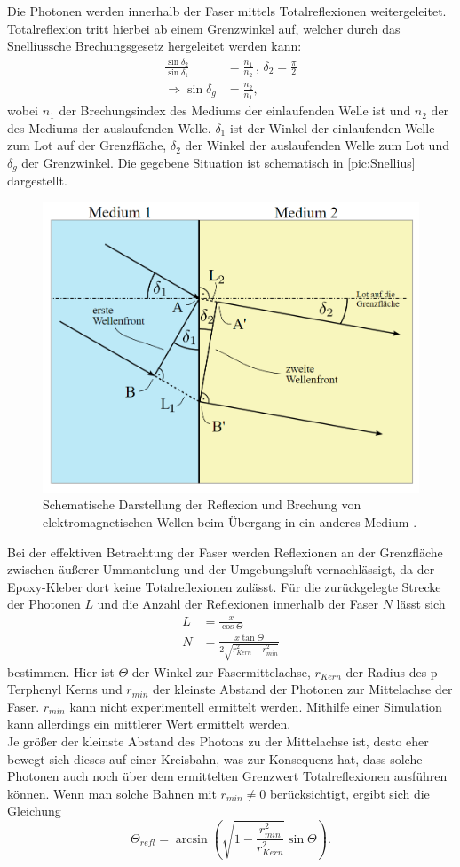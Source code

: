 Die Photonen werden innerhalb der Faser mittels Totalreflexionen weitergeleitet. Totalreflexion
tritt hierbei ab einem Grenzwinkel auf, welcher durch das Snelliussche Brechungsgesetz hergeleitet werden kann:
\begin{align}
    \label{eq:Snellius}
    \frac{\sin{\delta_2}}{\sin{\delta_1}} &= \frac{n_1}{n_2} \, , \, \delta_2 = \frac{\pi}{2} \\
    \Rightarrow \sin{\delta_g} &= \frac{n_2}{n_1},
\end{align}
wobei $n_1$ der Brechungsindex des Mediums der einlaufenden Welle ist und $n_2$ der des Mediums der auslaufenden
Welle. $\delta_1$ ist der Winkel der einlaufenden Welle zum Lot auf der Grenzfläche, $\delta_2$ der Winkel der auslaufenden
Welle zum Lot und $\delta_g$ der Grenzwinkel. Die gegebene Situation ist schematisch in \autoref{pic:Snellius} dargestellt.\\
\begin{figure}
    \centering
    \includegraphics[width = .5\textwidth]{content/pics/Snellius.png}
    \caption{Schematische Darstellung der Reflexion und Brechung von elektromagnetischen Wellen beim Übergang in ein anderes Medium \cite{Snellius}.}
    \label{pic:Snellius}
\end{figure}
Bei der effektiven Betrachtung der Faser werden Reflexionen an der Grenzfläche zwischen äußerer Ummantelung und der Umgebungsluft vernachlässigt, da der
Epoxy-Kleber dort keine Totalreflexionen zulässt. Für die zurückgelegte Strecke der Photonen $L$ und die Anzahl der Reflexionen innerhalb
der Faser $N$ lässt sich
\begin{align}
    \label{eq:rel}
    L &= \frac{x}{\cos{\Theta}}\\
    N &= \frac{x \tan{\Theta}}{2 \sqrt{r^2_{Kern} - r^2_{min}}}
\end{align}
bestimmen. Hier ist $\Theta$ der Winkel zur Fasermittelachse, $r_{Kern}$ der Radius des p-Terphenyl Kerns und $r_{min}$ der kleinste
Abstand der Photonen zur Mittelachse der Faser. $r_{min}$ kann nicht experimentell ermittelt werden. Mithilfe einer Simulation kann allerdings
ein mittlerer Wert ermittelt werden.\\
Je größer der kleinste Abstand des Photons zu der Mittelachse ist, desto eher bewegt sich dieses auf einer Kreisbahn, was zur Konsequenz hat,
dass solche Photonen auch noch über dem ermittelten Grenzwert Totalreflexionen ausführen können. Wenn man solche Bahnen mit $r_{min} \neq 0$ berücksichtigt,
ergibt sich die Gleichung
\begin{equation}
    \Theta_{refl} = \arcsin{\left(\sqrt{1 - \frac{r^2_{min}}{r^2_{Kern}}} \sin{\Theta}\right)}.
\end{equation}

